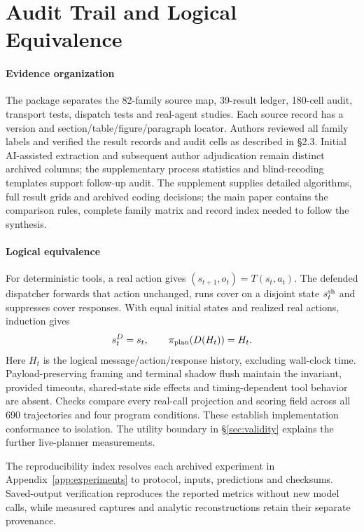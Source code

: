 \section{Audit Trail and Logical Equivalence}\label{app:equivalence}
\paragraph{Evidence organization}
The package separates the 82-family source map, 39-result ledger, 180-cell audit, transport tests, dispatch tests and real-agent studies. Each source record has a version and section/table/figure/paragraph locator. Authors reviewed all family labels and verified the result records and audit cells as described in \S2.3. Initial AI-assisted extraction and subsequent author adjudication remain distinct archived columns; the supplementary process statistics and blind-recoding templates support follow-up audit. The supplement supplies detailed algorithms, full result grids and archived coding decisions; the main paper contains the comparison rules, complete family matrix and record index needed to follow the synthesis.

\paragraph{Logical equivalence}
For deterministic tools, a real action gives $(s_{t+1},o_t)=T(s_t,a_t)$. The defended dispatcher forwards that action unchanged, runs cover on a disjoint state $s_t^{\rm sh}$ and suppresses cover responses. With equal initial states and realized real actions, induction gives
\[
s_t^D=s_t,\qquad \pi_{\rm plan}(D(H_t))=H_t.
\]
Here $H_t$ is the logical message/action/response history, excluding wall-clock time. Payload-preserving framing and terminal shadow flush maintain the invariant, provided timeouts, shared-state side effects and timing-dependent tool behavior are absent. Checks compare every real-call projection and scoring field across all 690 trajectories and four program conditions. These establish implementation conformance to isolation. The utility boundary in \S\ref{sec:validity} explains the further live-planner measurements.

The reproducibility index resolves each archived experiment in Appendix~\ref{app:experiments} to protocol, inputs, predictions and checksums. Saved-output verification reproduces the reported metrics without new model calls, while measured captures and analytic reconstructions retain their separate provenance.
